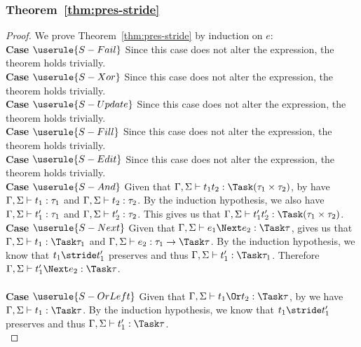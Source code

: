 \subsubsection{Theorem~\ref{thm:pres-stride}}
\begin{proof}
  We prove Theorem~\ref{thm:pres-stride} by induction on $e$:\\

  \noindent\textbf{Case} $\userule{S-Fail}$ Since this case does not alter the
  expression, the theorem holds trivially.\\

  \noindent\textbf{Case} $\userule{S-Xor}$ Since this case does not alter the
  expression, the theorem holds trivially.\\

  \noindent\textbf{Case} $\userule{S-Update}$ Since this case does not alter
  the expression, the theorem holds trivially.\\

  \noindent\textbf{Case} $\userule{S-Fill}$ Since this case does not alter the
  expression, the theorem holds trivially.\\

  \noindent\textbf{Case} $\userule{S-Edit}$ Since this case does not alter the
  expression, the theorem holds trivially.\\

  \noindent\textbf{Case} $\userule{S-And}$ Given that
  $\Gamma,\Sigma\infers t_1\And t_2:\Task(\tau_1\times\tau_2)$, by
   have $\Gamma,\Sigma\vdash t_1:\tau_1$ and
  $\Gamma,\Sigma\vdash t_2:\tau_2$. By the induction hypothesis, we also have $\Gamma,\Sigma\vdash t_1':\tau_1$ and $\Gamma,\Sigma\vdash t_2':\tau_2$.
  This gives us that
  $\Gamma,\Sigma\infers t_1'\And t_2':\Task(\tau_1\times\tau_2)$.\\

  \noindent\textbf{Case} $\userule{S-Next}$ Given that
  $\Gamma,\Sigma\infers e_1\Next e_2:\Task \tau$,  gives us that $\Gamma,\Sigma\infers t_1:\Task\tau_1$ and
  $\Gamma,\Sigma\infers e_2:\tau_1 \to \Task \tau$. By the induction hypothesis,
  we know that $t_1\stride t_1'$ preserves and thus
  $\Gamma,\Sigma\infers t_1':\Task\tau_1$. Therefore
  $\Gamma,\Sigma\infers t_1'\Next e_2:\Task\tau$.\\\\

  \noindent\textbf{Case} $\userule{S-OrLeft}$ Given that
  $\Gamma,\Sigma\infers t_1\Or t_2:\Task\tau$, by  we have
  $\Gamma,\Sigma\infers t_1:\Task\tau$. By the induction hypothesis, we know that
  $t_1\stride t_1'$ preserves and thus $\Gamma,\Sigma\infers t_1':\Task\tau$.\\


\end{proof}
